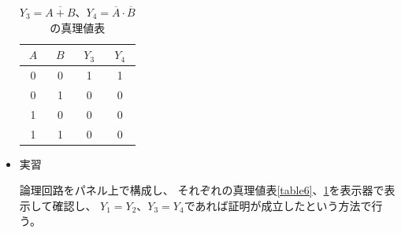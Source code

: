 \documentclass[12pt]{jarticle}
\begin{document}
\begin{itemize}
          \begin{table}[h]
              \caption{$Y_3= \overline{A + B}、Y_4 = \overline{A} \cdot \overline{B}$の真理値表}
              \begin{center}
                  \begin{tabular}{|c|c|c|c|}
                      \hline
                      $A$ & $B$ & $Y_3$ & $Y_4$ \\
                      \hline
                      0   & 0   & 1     & 1     \\
                      \hline
                      0   & 1   & 0     & 0     \\
                      \hline
                      1   & 0   & 0     & 0     \\
                      \hline
                      1   & 1   & 0     & 0     \\
                      \hline
                  \end{tabular}
              \end{center}
              \label{table7}
          \end{table}

    \item 実習

          論理回路をパネル上で構成し、
          それぞれの真理値表\ref{table6}、\ref{table7}を表示器で表示して確認し、
          $Y_1 = Y_2$、$Y_3 = Y_4$であれば証明が成立したという方法で行う。
\end{itemize}
\end{document}
